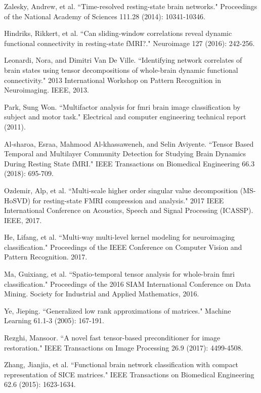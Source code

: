 \documentclass[journal]{IEEEtran}
\begin{document}
\begin{thebibliography}{1}
	Zalesky, Andrew, et al. ``Time-resolved resting-state brain networks." Proceedings of the National Academy of Sciences 111.28 (2014): 10341-10346.
	
	Hindriks, Rikkert, et al. ``Can sliding-window correlations reveal dynamic functional connectivity in resting-state fMRI?." Neuroimage 127 (2016): 242-256.
		
		
	Leonardi, Nora, and Dimitri Van De Ville. ``Identifying network correlates of brain states using tensor decompositions of whole-brain dynamic functional connectivity." 2013 International Workshop on Pattern Recognition in Neuroimaging. IEEE, 2013.
	
	 Park, Sung Won. ``Multifactor analysis for fmri brain image classification by subject and motor task." Electrical and computer engineering technical report (2011).
	
	
	Al-sharoa, Esraa, Mahmood Al-khassaweneh, and Selin Aviyente. ``Tensor Based Temporal and Multilayer Community Detection for Studying Brain Dynamics During Resting State fMRI." IEEE Transactions on Biomedical Engineering 66.3 (2018): 695-709.
	
	Ozdemir, Alp, et al. ``Multi-scale higher order singular value decomposition (MS-HoSVD) for resting-state FMRI compression and analysis." 2017 IEEE International Conference on Acoustics, Speech and Signal Processing (ICASSP). IEEE, 2017.
	
	 He, Lifang, et al. ``Multi-way multi-level kernel modeling for neuroimaging classification." Proceedings of the IEEE Conference on Computer Vision and Pattern Recognition. 2017.
	
	 Ma, Guixiang, et al. ``Spatio-temporal tensor analysis for whole-brain fmri classification." Proceedings of the 2016 SIAM International Conference on Data Mining. Society for Industrial and Applied Mathematics, 2016.
	
	
	Ye, Jieping. ``Generalized low rank approximations of matrices." Machine Learning 61.1-3 (2005): 167-191.
	
	
		Rezghi, Mansoor. ``A novel fast tensor-based preconditioner for image restoration." IEEE Transactions on Image Processing 26.9 (2017): 4499-4508.
		
		
	Zhang, Jianjia, et al. ``Functional brain network classification with compact representation of SICE matrices." IEEE Transactions on Biomedical Engineering 62.6 (2015): 1623-1634.
	

\end{thebibliography}
\end{document}
